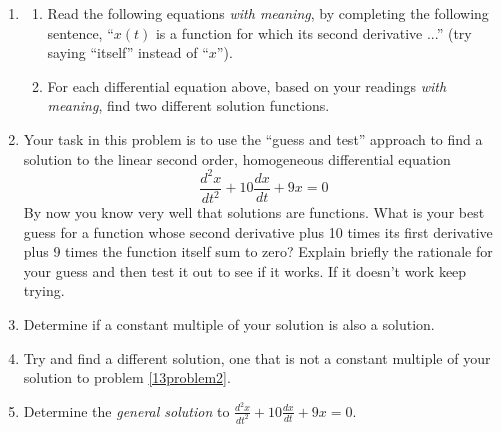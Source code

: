 \begin{enumerate}
\item \label{13problem1}
\begin{enumerate}
\item Read the following equations \textit{with meaning}, by completing the following sentence, ``$x(t)$ is a function for which its second derivative ...'' (try saying ``itself'' instead of ``$x$''). \\


\item For each differential equation above, based on your readings \textit{with meaning}, find two different solution functions. \vfill
\end{enumerate}
\item Your task in this problem is to use the ``guess and test'' approach to find a solution to the linear second order, homogeneous differential equation \label{13problem2}
\[
\frac{d^2x}{dt^2}+10\frac{dx}{dt}+9x=0
\]
By now you know very well that solutions are functions. What is your best guess for a function whose second derivative plus 10 times its first derivative plus 9 times the function itself sum to zero? Explain briefly the rationale for your guess and then test it out to see if it works. If it doesn't work keep trying. \vfill

\item Determine if a constant multiple of your solution is also a solution. \label{13problem3} \vfill

\clearpage

\item Try and find a different solution, one that is not a constant multiple of your solution to problem \ref{13problem2}. \label{13problem4} \vfill

\item Determine the \textit{general solution} to $\displaystyle\frac{d^2x}{dt^2}+10\frac{dx}{dt}+9x=0$. \label{13problem5} \vfill


\end{enumerate}
